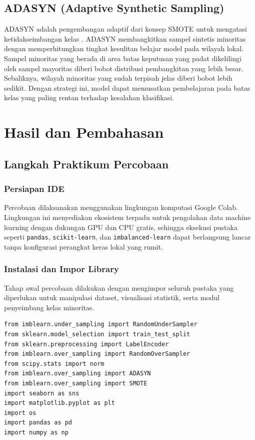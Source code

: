 \documentclass[a4paper,oneside,12pt]{report}
\begin{document}
\section{ADASYN (Adaptive Synthetic Sampling)}
ADASYN adalah pengembangan adaptif dari konsep SMOTE untuk mengatasi ketidakseimbangan kelas \cite{ref_ramadhanti}. ADASYN membangkitkan sampel sintetis minoritas dengan memperhitungkan tingkat kesulitan belajar model pada wilayah lokal. Sampel minoritas yang berada di area batas keputusan yang padat dikelilingi oleh sampel mayoritas diberi bobot distribusi pembangkitan yang lebih besar. Sebaliknya, wilayah minoritas yang sudah terpisah jelas diberi bobot lebih sedikit. Dengan strategi ini, model dapat memusatkan pembelajaran pada batas kelas yang paling rentan terhadap kesalahan klasifikasi.

\clearpage

\chapter[Hasil dan Pembahasan]{Hasil dan Pembahasan}

\section{Langkah Praktikum Percobaan}

\subsection{Persiapan IDE}
Percobaan dilaksanakan menggunakan lingkungan komputasi Google Colab. Lingkungan ini menyediakan ekosistem terpadu untuk pengolahan data machine learning dengan dukungan GPU dan CPU gratis, sehingga eksekusi pustaka seperti \texttt{pandas}, \texttt{scikit-learn}, dan \texttt{imbalanced-learn} dapat berlangsung lancar tanpa konfigurasi perangkat keras lokal yang rumit.

\subsection{Instalasi dan Impor Library}
Tahap awal percobaan dilakukan dengan mengimpor seluruh pustaka yang diperlukan untuk manipulasi dataset, visualisasi statistik, serta modul penyeimbang kelas minoritas.

\begin{lstlisting}[style=pythonstyle, caption={Impor Pustaka Preprocessing dan Balancing}]
from imblearn.under_sampling import RandomUnderSampler
from sklearn.model_selection import train_test_split
from sklearn.preprocessing import LabelEncoder
from imblearn.over_sampling import RandomOverSampler
from scipy.stats import norm
from imblearn.over_sampling import ADASYN
from imblearn.over_sampling import SMOTE
import seaborn as sns
import matplotlib.pyplot as plt
import os
import pandas as pd
import numpy as np
\end{lstlisting}
\end{document}
